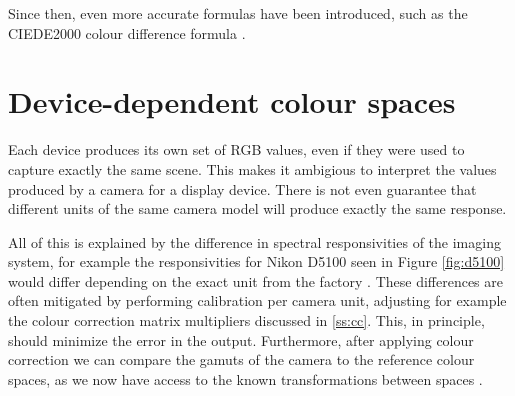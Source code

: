 Since then, even more accurate formulas have been introduced, such as the CIEDE2000 colour difference formula \cite{ciede2000dev}.

\section{Device-dependent colour spaces}

 Each device produces its own set of RGB values, even if they were used to capture exactly the same scene. This makes it ambigious to interpret the values produced by a camera for a display device. There is not even guarantee that different units of the same camera model will produce exactly the same response. 
 
 All of this is explained by the difference in spectral responsivities of the imaging system, for example the responsivities for Nikon D5100 seen in Figure \ref{fig:d5100} would differ depending on the exact unit from the factory \cite{walowit2019best}. These differences are often mitigated by performing calibration per camera unit, adjusting for example the colour correction matrix multipliers discussed in \ref{ss:cc}. This, in principle, should minimize the error in the output. Furthermore, after applying colour correction we can compare the gamuts of the camera to the reference colour spaces, as we now have access to the known transformations between spaces \cite{rowlands2020color}.